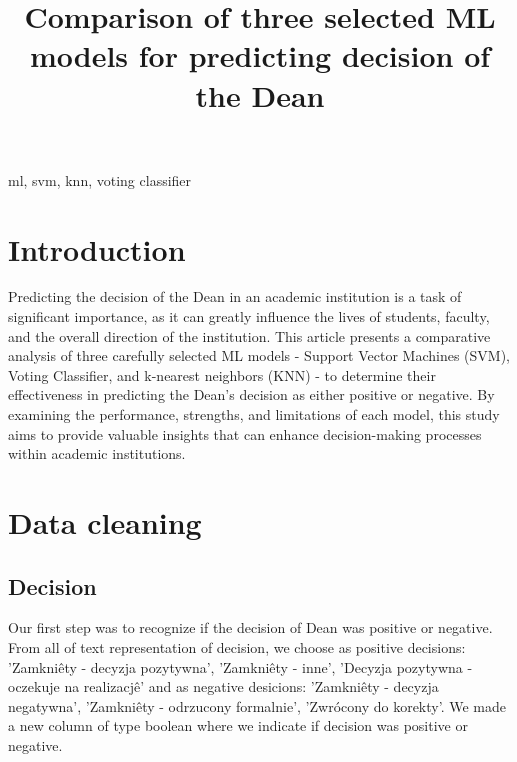 \documentclass[conference]{IEEEtran}
\begin{document}
\title{Comparison of three selected ML models for predicting decision of the Dean}

\author{
\and
{}
}

\maketitle

\begin{abstract}
\end{abstract}

\begin{IEEEkeywords}
ml, svm, knn, voting classifier
\end{IEEEkeywords}

\section{Introduction}
Predicting the decision of the Dean in an academic institution is a task of significant importance, as it can greatly influence the lives of students, faculty, and the overall direction of the institution. This article presents a comparative analysis of three carefully selected ML models - Support Vector Machines (SVM), Voting Classifier, and k-nearest neighbors (KNN) - to determine their effectiveness in predicting the Dean's decision as either positive or negative. By examining the performance, strengths, and limitations of each model, this study aims to provide valuable insights that can enhance decision-making processes within academic institutions.

\section{Data cleaning}
\subsection{Decision}
Our first step was to recognize if the decision of Dean was positive or negative.
From all of text representation of decision, we  choose  as positive decisions: 'Zamkniêty - decyzja pozytywna', 'Zamkniêty - inne', 'Decyzja pozytywna - oczekuje na realizacjê' and as negative desicions: 'Zamkniêty - decyzja negatywna', 'Zamkniêty - odrzucony formalnie', 'Zwrócony do korekty'.
We made a new column of type boolean where we indicate if decision was positive or negative.
\end{document}
